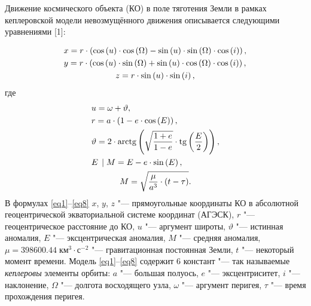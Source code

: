 
\vzmscaption


Движение космического объекта (КО) в поле тяготения Земли в рамках кеплеровской модели невозмущённого движения описывается следующими уравнениями [1]:

\vskip-7mm
\begin{gather}
\label{eq1}
	x = r \cdot \left( {\cos \left( u \right) \cdot \cos \left( \Omega \right) - \sin \left( u \right) \cdot \sin \left( \Omega \right) \cdot \cos \left( i \right)} \right), \hfill \\
\label{eq2}
	y = r \cdot \left( {\cos \left( u \right) \cdot \sin \left( \Omega \right) + \sin \left( u \right) \cdot \cos \left( \Omega \right) \cdot \cos \left( i \right)} \right), \hfill \\
\label{eq3}
	z = r \cdot \sin \left( u \right) \cdot \sin \left( i \right),
\end{gather}
\vskip-5mm
\noindent
где
\vskip-7mm
\begin{gather}
\label{eq4}
	u = \omega + \vartheta , \hfill \\
\label{eq5}
	r = a \cdot \left( {1 - e \cdot \cos \left( E \right)} \right), \hfill \\
\label{eq6}
	\vartheta = 2 \cdot \operatorname{arctg} \left( {\sqrt {\frac{{1 + e}}{{1 - e}}} \cdot \operatorname{tg}\left( {\frac{E}{2}} \right)} \right),\hfill \\
\label{eq7}
	E\;\left| {\;M = E - e \cdot \sin \left( E \right),} \right. \hfill \\
\label{eq8}
	M = \sqrt {\frac{\mu }{{{a^3}}} \cdot \left( {t - \tau } \right)} .
\end{gather}
\vskip-3mm
В формулах \eqref{eq1}--\eqref{eq8}
$x$, $y$, $z$ "--- прямоугольные координаты КО в абсолютной геоцентрической экваториальной системе координат (АГЭСК),
$r$ "--- геоцентрическое расстояние до КО,
$u$ "--- аргумент широты,
$\vartheta $ "--- истинная аномалия,
$E$ "--- эксцентрическая аномалия,
$M$ "--- средняя аномалия,
$\mu = 398600.44\;\text{км}^3 \cdot \text{с}^ {- 2}$ "--- гравитационная постоянная Земли,
$t$ "--- некоторый момент времени. Модель \eqref{eq1}--\eqref{eq8} содержит 6 констант "--- так называемые \textit{кеплеровы} элементы орбиты:
$a$ "--- большая полуось,
$e$ "--- эксцентриситет,
$i$ "--- наклонение,
$\Omega$ "--- долгота восходящего узла,
$\omega$ "--- аргумент перигея,
$\tau$ "--- время прохождения перигея.

